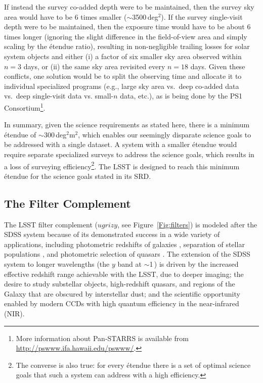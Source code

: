 If instead the survey co-added depth were to be maintained, then the survey sky
area would have to be 6 times smaller ($\sim$3500\,deg$^2$). If the
survey single-visit depth were to be maintained, then the exposure
time would have to be about 6 times longer (ignoring the slight difference
in the field-of-view area and simply scaling by the \'etendue ratio),
resulting in non-negligible trailing losses for solar system objects
and either
(i) a factor of six smaller sky area observed within $n=3$ days, or
(ii) the same sky area revisited every $n=18$ days.
Given these conflicts, one solution would be to split the observing time and
allocate it to individual specialized programs (e.g., large sky area vs.\
deep co-added data vs.\ deep single-visit data vs. small-$n$ data, etc.),
as is being done by the PS1 Consortium\footnote{More information about
Pan-STARRS is available from \url{http://pswww.ifa.hawaii.edu/pswww/}.}.

In summary,
given the science requirements as stated here, there is a
minimum \'etendue of $\sim$300\,deg$^2$m$^2$, which enables our seemingly
disparate science goals to be addressed with a single dataset.
A system with a smaller \'etendue would require separate specialized surveys
to address the science goals, which results in a loss of surveying
efficiency\footnote{The converse is also true: for every \'etendue
there is a set of optimal science goals that such a system can
address with a high efficiency.}. The LSST is designed to reach this
minimum \'etendue for the science goals stated in its SRD.



\subsection{  The Filter Complement }

The LSST filter complement ($ugrizy$, see Figure~\ref{Fig:filters}) is modeled after the
SDSS system \citep{1996AJ....111.1748F} because of its demonstrated success in a wide
variety of applications, including photometric redshifts of galaxies \citep{2003ApJ...595...59B},
separation of stellar populations \citep{1998ApJS..119..121L,2003ApJ...586..195H},
and photometric selection of quasars \citep{2002AJ....123.2945R,2012ApJS..199....3R}. The extension of the
SDSS system to longer wavelengths
(the $y$ band at $\sim$1\,\micron) is driven by the increased effective redshift
range achievable with the LSST, due to deeper imaging; the desire to study substellar
objects, high-redshift quasars, and regions of the Galaxy that are obscured by
interstellar dust; and
the scientific opportunity enabled by modern CCDs with high quantum efficiency
in the near-infrared (NIR).

